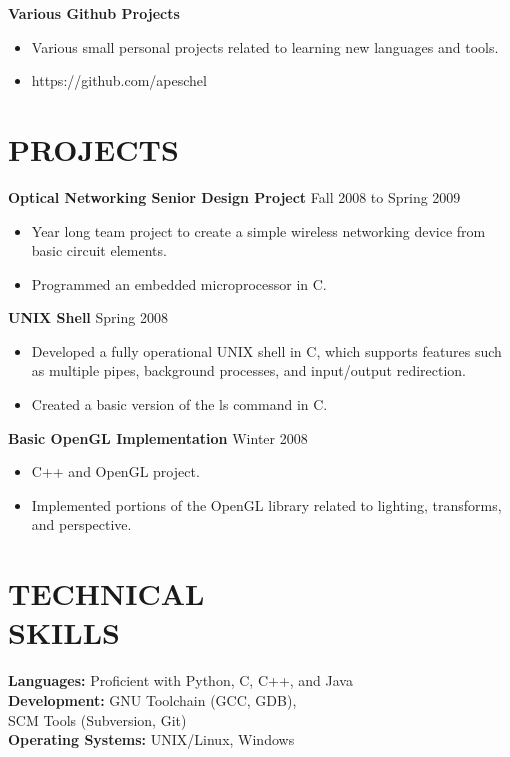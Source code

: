 \documentclass[10pt,line,margin]{res}
\begin{document}
\begin{resume}
    {\bf Various Github Projects}
    \begin{itemize} \itemsep -2pt
    \item Various small personal projects related to learning new languages and tools.
    \item https://github.com/apeschel
    \end{itemize}

\section {PROJECTS}

    {\bf Optical Networking Senior Design Project} \hfill Fall 2008 to Spring 2009
    \begin{itemize} \itemsep -2pt
    \item Year long team project to create a simple wireless
    networking device from basic circuit elements.
    \item Programmed an embedded microprocessor in C.
    \end{itemize}

    {\bf UNIX Shell} \hfill Spring 2008
    \begin{itemize} \itemsep -2pt
    \item Developed a fully operational UNIX shell in C, which
    supports features such as multiple pipes, background processes,
    and input/output redirection.
    \item Created a basic version of the ls command in C.
    \end{itemize}

    {\bf Basic OpenGL Implementation} \hfill Winter 2008
    \begin{itemize} \itemsep -2pt
    \item C++ and OpenGL project.
    \item Implemented portions of the OpenGL library
    related to lighting, transforms, and perspective.
    \end{itemize}

\section{TECHNICAL \\ SKILLS}
    {\bf Languages:} Proficient with Python, C, C++, and Java \\
    {\bf Development:} GNU Toolchain (GCC, GDB), \\ SCM Tools (Subversion, Git) \\
    {\bf Operating Systems:} UNIX/Linux, Windows \\

\end{resume}
\end{document}

